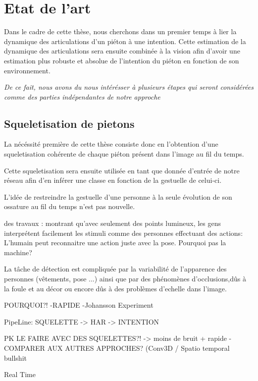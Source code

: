\section{Etat de l'art}
\label{sec:SOTA}

Dans le cadre de cette thèse, nous cherchons dans un premier temps à lier la dynamique des articulations d'un piéton à une intention. Cette estimation de la dynamique des articulations sera ensuite combinée à la vision afin d’avoir une estimation plus robuste et absolue de l'intention du piéton en fonction de son environnement.

\textit{De ce fait, nous avons du nous intérésser à plusieurs étapes qui seront considérées comme des parties indépendantes de notre approche}

\subsection{Squeletisation de pietons}
La nécéssité première de cette thèse consiste donc en l'obtention d'une squeletisation cohérente de chaque piéton présent dans l'image au fil du temps.

Cette squeletisation sera ensuite utilisée en tant que donnée d'entrée de notre réseau afin d'en inférer une classe en fonction de la gestuelle de celui-ci.

L'idée de restreindre la gestuelle d'une personne à la seule évolution de son ossature au fil du temps n'est pas nouvelle.

des travaux  \cite{johansson1973visual,johansson1976spatio}: montrant qu'avec seulement des points lumineux, les gens interprétent facilement les stimuli comme des personnes effectuant des actions: L'humain peut reconnaitre une action juste avec la pose. Pourquoi pas la machine?

La tâche de détection est compliquée par la variabilité de l’apparence des personnes (vêtements, pose ...)
ainsi que par des phénomènes d’occlusions,dûs à la foule et au décor ou encore dûs à des problèmes d'echelle dans l'image.





POURQUOI?!
-RAPIDE
-Johansson Experiment 

PipeLine: SQUELETTE -> HAR -> INTENTION

PK LE FAIRE AVEC DES SQUELETTES?! -> moins de bruit + rapide
-COMPARER AUX AUTRES APPROCHES? (Conv3D / Spatio temporal bullshit

Real Time


